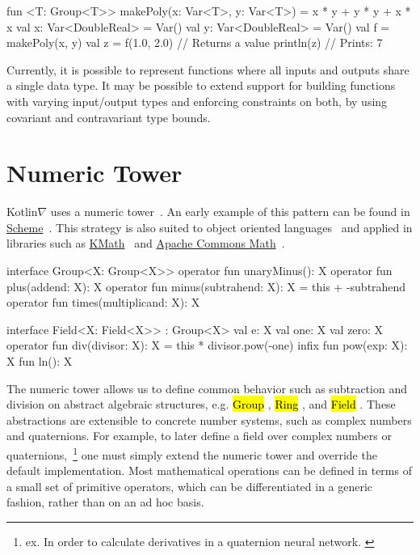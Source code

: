 \documentclass[12pt,initial,twoside,maitrise]{dms}
\newcommand{\inline}[1]{%
    \begingroup%
    \sethlcolor{slightgray}%
    \hl{\ttfamily\small #1}%
    \endgroup
}
\numberwithin{equation}{section}
\numberwithin{table}{chapter}
\numberwithin{figure}{chapter}
\begin{document}
\begin{kotlinlisting}
fun <T: Group<T>> makePoly(x: Var<T>, y: Var<T>) = x * y + y * y + x * x
val x: Var<DoubleReal> = Var()
val y: Var<DoubleReal> = Var()
val f = makePoly(x, y)
val z = f(1.0, 2.0) // Returns a value
println(z) // Prints: 7
\end{kotlinlisting}
%
Currently, it is possible to represent functions where all inputs and outputs share a single data type. It may be possible to extend support for building functions with varying input/output types and enforcing constraints on both, by using covariant and contravariant type bounds.

\section{Numeric Tower}\label{sec:numeric-tower}

Kotlin$\nabla$ uses a numeric tower~\citep{st2012typing}. An early example of this pattern can be found in \href{https://www.gnu.org/software/guile/manual/html_node/Numerical-Tower.html}{Scheme}~\citep{sperber2009revised}. This strategy is also suited to object oriented languages~\citep{niculescu2003design, niculescu2011using, kennedy2005generalized} and applied in libraries such as \href{https://github.com/mipt-npm/kmath}{KMath}~\citep{nozik2019kmath} and \href{https://commons.apache.org/proper/commons-math/}{Apache Commons Math}~\citep{developers2012apache}.

\begin{kotlinlisting}
interface Group<X: Group<X>> {
    operator fun unaryMinus(): X
    operator fun plus(addend: X): X
    operator fun minus(subtrahend: X): X = this + -subtrahend
    operator fun times(multiplicand: X): X
}

interface Field<X: Field<X>> : Group<X> {
    val e: X
    val one: X
    val zero: X
    operator fun div(divisor: X): X = this * divisor.pow(-one)
    infix fun pow(exp: X): X
    fun ln(): X
}
\end{kotlinlisting}
%
The numeric tower allows us to define common behavior such as subtraction and division on abstract algebraic structures, e.g. \inline{Group}, \inline{Ring}, and \inline{Field}. These abstractions are extensible to concrete number systems, such as complex numbers and quaternions. For example, to later define a field over complex numbers or quaternions,~\footnote{ex. In order to calculate derivatives in a quaternion neural network. \citep{isokawa2003quaternion}} one must simply extend the numeric tower and override the default implementation. Most mathematical operations can be defined in terms of a small set of primitive operators, which can be differentiated in a generic fashion, rather than on an ad hoc basis.
\end{document}
